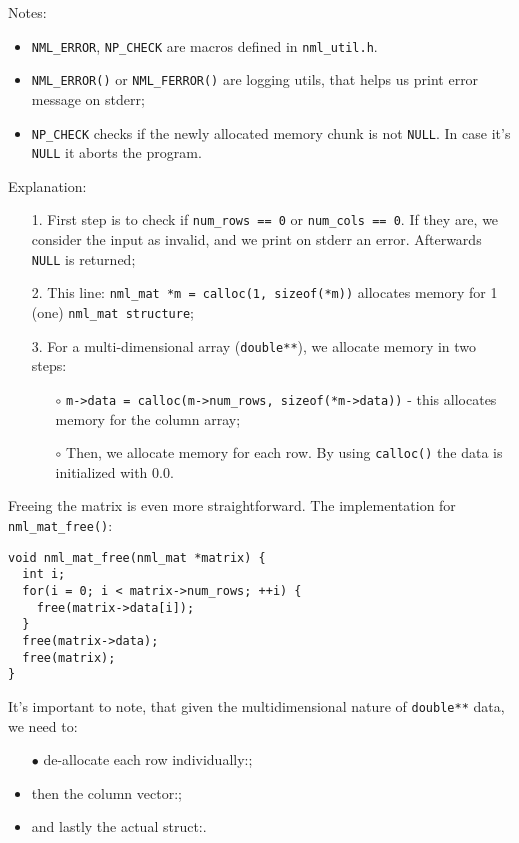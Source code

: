 Notes:

\begin{itemize}
\item {\tt NML\_ERROR}, {\tt NP\_CHECK} are macros defined in {\tt nml\_util.h}.
\item {\tt NML\_ERROR()} or {\tt NML\_FERROR()} are logging utils, that helps us print error message on stderr;
\item {\tt NP\_CHECK} checks if the newly allocated memory chunk is not {\tt NULL}. In case it’s {\tt NULL} it aborts the program.
\end{itemize}

Explanation:

\begin{itemize}
\item[1.] First step is to check if {\tt num\_rows == 0} or {\tt num\_cols == 0}. If they are, we consider the input as invalid, and we print on stderr an error. Afterwards {\tt NULL} is returned;

\item[2.] This line: {\tt nml\_mat *m = calloc(1, sizeof(*m))} allocates memory for 1 (one) {\tt nml\_mat structure};
\item[3.] For a multi-dimensional array ({\tt double**}), we allocate memory in two steps:

\begin{itemize}
\item[$\circ$] {\tt m->data = calloc(m->num\_rows, sizeof(*m->data))} - this allocates memory for the column array;
\item[$\circ$] Then, we allocate memory for each row. By using {\tt calloc()} the data is initialized with 0.0.
\end{itemize}
\end{itemize}

Freeing the matrix is even more straightforward. The implementation for {\tt nml\_mat\_free()}:

\begin{verbatim}
void nml_mat_free(nml_mat *matrix) {
  int i;
  for(i = 0; i < matrix->num_rows; ++i) {
    free(matrix->data[i]);
  }
  free(matrix->data);
  free(matrix);
}
\end{verbatim}
It’s important to note, that given the multidimensional nature of {\tt double**} data, we need to:

\begin{itemize}
\item[$\bullet$] de-allocate each row individually:;
\item then the column vector:;
\item and lastly the actual struct:.
\end{itemize}

